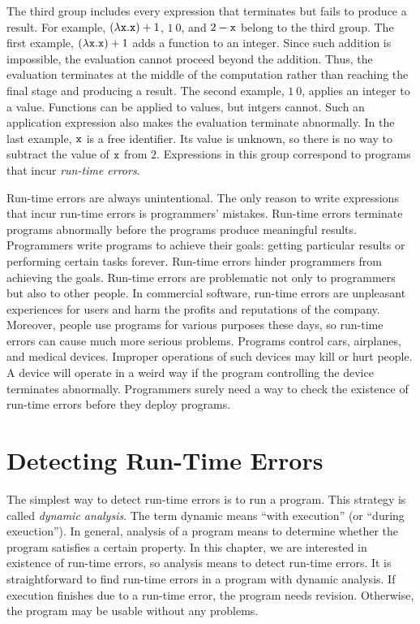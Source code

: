 The third group includes every expression that terminates but fails to produce
a result. For example, $(\lambda \texttt{x}.\texttt{x})+1$, $1\ 0$, and $2-\texttt{x}$
belong to the third group. The first example, $(\lambda \texttt{x}.\texttt{x})+1$
adds a function to an integer. Since such addition is impossible, the evaluation
cannot proceed beyond the addition. Thus, the evaluation terminates at the
middle of the computation rather than reaching the final stage and producing a
result. The second example, $1\ 0$, applies an integer to a value. Functions can
be applied to values, but intgers cannot. Such an application expression also
makes the evaluation terminate abnormally. In the last example, $\texttt{x}$ is a free
identifier. Its value is unknown, so there is no way to subtract the value of
$\texttt{x}$ from $2$. Expressions in this group correspond to programs that incur
\textit{run-time errors}.

Run-time errors are always unintentional. The only reason to write expressions
that incur run-time errors is programmers' mistakes. Run-time errors terminate
programs abnormally before the programs produce meaningful results. Programmers
write programs to achieve their goals: getting particular results or performing
certain tasks forever. Run-time errors hinder programmers from achieving the
goals. Run-time errors are problematic not only to programmers but also to other
people. In commercial software, run-time errors are unpleasant experiences for users
and harm the profits and reputations of the company. Moreover,
people use programs for various purposes these days, so run-time errors can
cause much more serious problems. Programs control cars, airplanes, and medical
devices. Improper operations of such devices may kill or hurt people. A device
will operate in a weird way if the program controlling the device terminates abnormally.
Programmers surely need a way to check the existence of run-time errors before
they deploy programs.

\section{Detecting Run-Time Errors}

The simplest way to detect run-time errors is to run a program. This strategy is
called \textit{dynamic analysis}. The term dynamic
means ``with execution'' (or ``during exeuction''). In general, analysis of a
program means to determine whether the program satisfies a certain property. In
this chapter, we are interested in existence of run-time errors, so analysis
means to detect run-time errors.
It is straightforward to find run-time errors in a
program with dynamic analysis. If execution finishes due to a
run-time error, the program needs revision. Otherwise, the program may
be usable without any problems.

